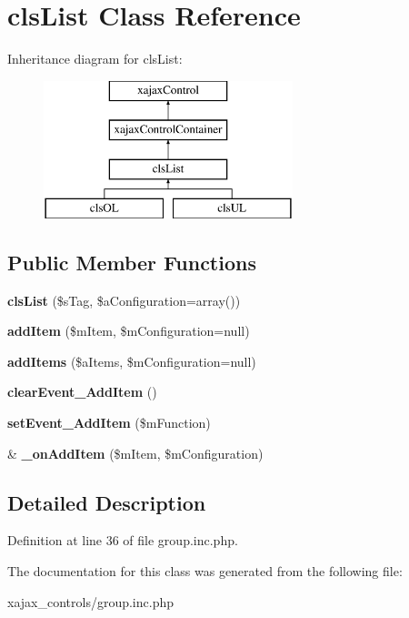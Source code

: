 \hypertarget{classclsList}{
\section{clsList Class Reference}
\label{classclsList}
}
Inheritance diagram for clsList:\begin{figure}[H]
\begin{center}
\leavevmode
\includegraphics[height=4.000000cm]{classclsList}
\end{center}
\end{figure}
\subsection*{Public Member Functions}
\begin{DoxyCompactItemize}
\item 
\hypertarget{classclsList_a061cc0e9d713f527d76908f747474a51}{
{\bfseries clsList} (\$sTag, \$aConfiguration=array())}
\label{classclsList_a061cc0e9d713f527d76908f747474a51}

\item 
\hypertarget{classclsList_a7a2952c6565257e7830e919ff606475e}{
{\bfseries addItem} (\$mItem, \$mConfiguration=null)}
\label{classclsList_a7a2952c6565257e7830e919ff606475e}

\item 
\hypertarget{classclsList_a57250c3fe8febafbcf0c6b18e24047b5}{
{\bfseries addItems} (\$aItems, \$mConfiguration=null)}
\label{classclsList_a57250c3fe8febafbcf0c6b18e24047b5}

\item 
\hypertarget{classclsList_a0a22072328b60be67e223bbd6c76f942}{
{\bfseries clearEvent\_\-AddItem} ()}
\label{classclsList_a0a22072328b60be67e223bbd6c76f942}

\item 
\hypertarget{classclsList_abaf1f0c19c2ed96fb94189e2f1417738}{
{\bfseries setEvent\_\-AddItem} (\$mFunction)}
\label{classclsList_abaf1f0c19c2ed96fb94189e2f1417738}

\item 
\hypertarget{classclsList_a5500888d0364980cba3384a9cfc73524}{
\& {\bfseries \_\-onAddItem} (\$mItem, \$mConfiguration)}
\label{classclsList_a5500888d0364980cba3384a9cfc73524}

\end{DoxyCompactItemize}


\subsection{Detailed Description}


Definition at line 36 of file group.inc.php.



The documentation for this class was generated from the following file:\begin{DoxyCompactItemize}
\item 
xajax\_\-controls/group.inc.php\end{DoxyCompactItemize}
